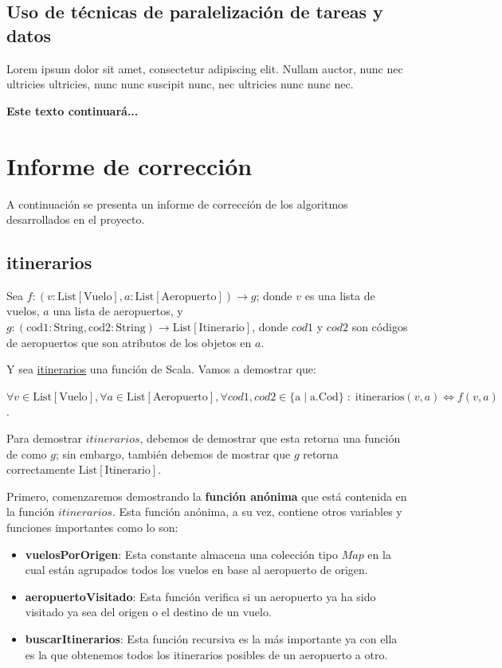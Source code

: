 \documentclass[letterpaper]{article}
\begin{document}
\subsection{Uso de técnicas de paralelización de tareas y datos}

Lorem ipsum dolor sit amet, consectetur adipiscing elit.
Nullam auctor, nunc nec ultricies ultricies, nunc nunc
suscipit nunc, nec ultricies nunc nunc nec.

\textbf{Este texto continuará...}


\section{Informe de corrección}

A continuación se presenta un informe de corrección de los algoritmos desarrollados en el proyecto.

\subsection{itinerarios}

Sea $f: (v: \text{List}[\text{Vuelo}], a: \text{List}[\text{Aeropuerto}]) \rightarrow g$;
donde $v$ es una lista de vuelos, $a$ una lista de aeropuertos, y $g: (\text{cod1}: \text{String}, \text{cod2}: \text{String}) \rightarrow \text{List}[\text{Itinerario}]$,
donde $cod1$ y $cod2$ son códigos de aeropuertos que son atributos de los objetos en $a$.

Y sea \hyperref[itinerarios]{itinerarios} una función de Scala. Vamos a demostrar que:

\begin{center}
  $\forall v \in \text{List}[\text{Vuelo}], \forall a \in \text{List}[\text{Aeropuerto}], \forall cod1, cod2 \in \{ \text{a} \mid \text{a.Cod}\} \; : \; \text{itinerarios}(v, a) \Longleftrightarrow f(v, a)$.
\end{center}

Para demostrar $itinerarios$, debemos de demostrar que esta retorna una función
de como $g$; sin embargo, también debemos de mostrar que $g$ retorna correctamente $\text{List}[\text{Itinerario}]$.

Primero, comenzaremos demostrando la \textbf{función anónima} que está contenida en la función $itinerarios$.
Esta función anónima, a su vez, contiene otros variables y funciones importantes como lo son:

\begin{itemize}
  \item \textbf{vuelosPorOrigen}: Esta constante almacena una colección tipo $Map$ en la cual están agrupados todos los vuelos en base al aeropuerto de origen.
  \item \textbf{aeropuertoVisitado}: Esta función verifica si un aeropuerto ya ha sido visitado ya sea del origen o el destino de un vuelo.
  \item \textbf{buscarItinerarios}: Esta función recursiva es la más importante ya con ella es la que obtenemos todos los itinerarios posibles de un aeropuerto a otro.
\end{itemize}
\end{document}
